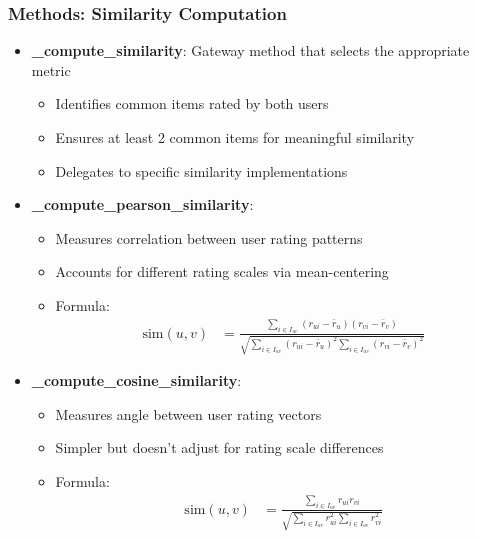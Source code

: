 \documentclass{beamer}
\begin{document}
\begin{frame}
\frametitle{Methods: Similarity Computation}

\begin{itemize}
    \item \textbf{\_compute\_similarity}: Gateway method that selects the appropriate metric
    \begin{itemize}
        \item Identifies common items rated by both users
        \item Ensures at least 2 common items for meaningful similarity
        \item Delegates to specific similarity implementations
    \end{itemize}
    
    \item \textbf{\_compute\_pearson\_similarity}:
    \begin{itemize}
        \item Measures correlation between user rating patterns
        \item Accounts for different rating scales via mean-centering
        \item Formula: 
        \begin{align*}
        \text{sim}(u,v) &= \frac{\sum_{i \in I_{uv}}(r_{ui}-\bar{r}_u)(r_{vi}-\bar{r}_v)}{\sqrt{\sum_{i \in I_{uv}}(r_{ui}-\bar{r}_u)^2 \sum_{i \in I_{uv}}(r_{vi}-\bar{r}_v)^2}}
        \end{align*}
    \end{itemize}
    
    \item \textbf{\_compute\_cosine\_similarity}:
    \begin{itemize}
        \item Measures angle between user rating vectors
        \item Simpler but doesn't adjust for rating scale differences
        \item Formula: 
        \begin{align*}
        \text{sim}(u,v) &= \frac{\sum_{i \in I_{uv}}r_{ui}r_{vi}}{\sqrt{\sum_{i \in I_{uv}}r_{ui}^2 \sum_{i \in I_{uv}}r_{vi}^2}}
        \end{align*}
    \end{itemize}
\end{itemize}
\end{frame}
\end{document}
